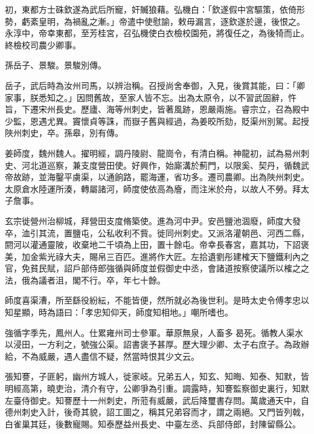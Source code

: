 \begin{pinyinscope}
 初，東都方士硃欽遂為武后所寵，奸贓狼藉。弘機白：「欽遂假中宮驅策，依倚形勢，虧紊皇明，為禍亂之漸。」帝遣中使慰諭，敕毋漏言，逐欽遂於邊，後恨之。永淳中，帝幸東都，至芳桂宮，召弘機使白衣檢校園苑，將復任之，為後犄而止。終檢校司農少卿事。



 孫岳子、景駿。景駿別傳。



 岳子，武后時為汝州司馬，以辨治稱。召授尚舍奉御，入見，後賞其能，曰：「卿家事，朕悉知之。」因問舊故，至家人皆不忘。出為太原令，以不習武固辭，忤旨，下遷宋州長史。歷廬、海等州刺史，皆著風跡，恩嚴兩施。睿宗立，召為殿中少監，恩遇尤異。竇懷貞等誅，而嶽子舊與經過，為姜晈所劾，貶渠州別駕。起授陜州刺史，卒。孫皋，別有傳。



 姜師度，魏州魏人。擢明經，調丹陵尉、龍崗令，有清白稱。神龍初，試為易州刺史、河北道巡察，兼支度營田使。好興作，始廝溝於薊門，以限奚、契丹，循魏武帝故跡，並海鑿平虜渠，以通餉路，罷海運，省功多。遷司農卿。出為陜州刺史。太原倉水陸運所湊，轉屬諸河，師度使依高為廥，而注米於舟，以故人不勞。拜太子詹事。



 玄宗徙營州治柳城，拜營田支度脩築使。進為河中尹。安邑鹽池涸廢，師度大發卒，洫引其流，置鹽屯，公私收利不貲。徙同州刺史。又派洛灌朝邑、河西二縣，閼河以灌通靈陂，收棄地二千頃為上田，置十餘屯。帝幸長春宮，嘉其功，下詔褒美，加金紫光祿大夫，賜帛三百匹。進將作大匠。左拾遺劉彤建榷天下鹽鐵利內之官，免貧民賦，詔戶部侍郎強循與師度並假御史中丞，會諸道按察使議所以榷之之法，俄為議者沮，閣不行。卒，年七十餘。



 師度喜渠漕，所至繇役紛紜，不能皆便，然所就必為後世利。是時太史令傅孝忠以知星顯，時為語曰：「孝忠知仰天，師度知相地。」嘲所嗜也。



 強循字季先，鳳州人。仕累雍州司士參軍。華原無泉，人畜多曷死。循教人渠水以浸田，一方利之，號強公渠。詔書褒予甚厚。歷大理少卿、太子右庶子。為政辦給，不為威嚴，遇人盡信不疑，然當時恨其少文云。



 張知謇，子匪躬，幽州方城人，徙家岐。兄弟五人，知玄、知晦、知泰、知默，皆明經高第，曉吏治，清介有守，公卿爭為引重。調露時，知謇監察御史裏行，知默左臺侍御史。知謇歷十一州刺史，所蒞有威嚴，武后降璽書存問。萬歲通天中，自德州刺史入計，後奇其貌，詔工圖之，稱其兄弟容而才，謂之兩絕。又門皆列戟，白雀巢其廷，後數寵賜。知泰歷益州長史、中臺左丞、兵部侍郎，封陳留縣公。




\end{pinyinscope}
